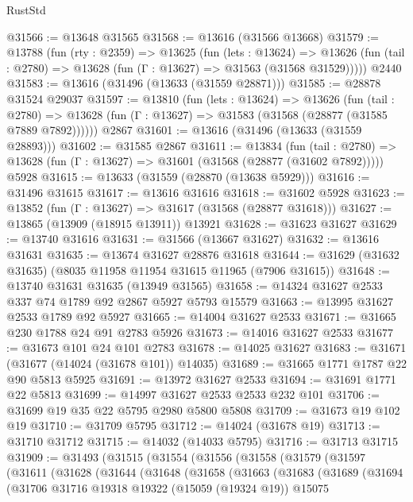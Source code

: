 \begin{lexlean}{RustStd}
\begin{coremodule}
@31566 := @13648 @31565
@31568 := @13616 (@31566 @13668)
@31579 := @13788
    (fun (rty : @2359) =>
    @13625
      (fun (lets : @13624) =>
      @13626 (fun (tail : @2780) => @13628 (fun (Γ : @13627) => @31563 (@31568 @31529)))))
    @2440
@31583 := @13616 (@31496 (@13633 (@31559 @28871)))
@31585 := @28878 @31524 @29037
@31597 := @13810
    (fun (lets : @13624) =>
    @13626
      (fun (tail : @2780) =>
      @13628 (fun (Γ : @13627) => @31583 (@31568 (@28877 (@31585 @7889 @7892))))))
    @2867
@31601 := @13616 (@31496 (@13633 (@31559 @28893)))
@31602 := @31585 @2867
@31611 := @13834
    (fun (tail : @2780) => @13628 (fun (Γ : @13627) => @31601 (@31568 (@28877 (@31602 @7892)))))
    @5928
@31615 := @13633 (@31559 (@28870 (@13638 @5929)))
@31616 := @31496 @31615
@31617 := @13616 @31616
@31618 := @31602 @5928
@31623 := @13852 (fun (Γ : @13627) => @31617 (@31568 (@28877 @31618)))
@31627 := @13865 (@13909 (@18915 @13911)) @13921
@31628 := @31623 @31627
@31629 := @13740 @31616
@31631 := @31566 (@13667 @31627)
@31632 := @13616 @31631
@31635 := @13674 @31627 @28876 @31618
@31644 := @31629 (@31632 @31635) (@8035 @11958 @11954 @31615 @11965 (@7906 @31615))
@31648 := @13740 @31631 @31635 (@13949 @31565)
@31658 := @14324 @31627 @2533 @337 @74 @1789 @92 @2867 @5927 @5793 @15579
@31663 := @13995 @31627 @2533 @1789 @92 @5927
@31665 := @14004 @31627 @2533
@31671 := @31665 @230 @1788 @24 @91 @2783 @5926
@31673 := @14016 @31627 @2533
@31677 := @31673 @101 @24 @101 @2783
@31678 := @14025 @31627
@31683 := @31671 (@31677 (@14024 (@31678 @101)) @14035)
@31689 := @31665 @1771 @1787 @22 @90 @5813 @5925
@31691 := @13972 @31627 @2533
@31694 := @31691 @1771 @22 @5813
@31699 := @14997 @31627 @2533 @2533 @232 @101
@31706 := @31699 @19 @35 @22 @5795 @2980 @5800 @5808
@31709 := @31673 @19 @102 @19
@31710 := @31709 @5795
@31712 := @14024 (@31678 @19)
@31713 := @31710 @31712
@31715 := @14032 (@14033 @5795)
@31716 := @31713 @31715
@31909 := @31493
    (@31515
      (@31554
        (@31556
          (@31558
            (@31579
              (@31597
                (@31611
                  (@31628
                    (@31644
                      (@31648
                        (@31658
                          (@31663
                            (@31683
                              (@31689
                                (@31694
                                  (@31706
                                    @31716
                                    @19318
                                    @19322
                                    (@15059 (@19324 @19))
                                    @15075

\end{coremodule}
\end{lexlean}

